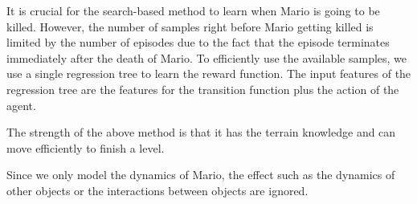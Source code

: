 It is crucial for the search-based method to learn when Mario is going to be killed. 
However, the number of samples right before Mario getting killed is limited by the
number of episodes due to the fact that the episode terminates immediately after the death of Mario.
To efficiently use the available samples, we use a single regression tree to learn the 
reward function. The input features of the regression tree are
the features for the transition function plus the action of the agent. 

The strength of the above method is that it has the terrain knowledge and can move
efficiently to finish a level.









%


Since we only model the dynamics of Mario, the effect such as the dynamics of other objects or
the interactions between objects are ignored. 


